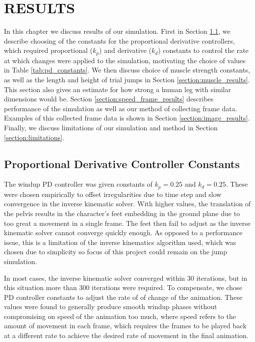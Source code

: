 
 
\chapter{RESULTS}
\label{chapter:results}
In this chapter we discuss results of our simulation.  First in Section \ref{section:pd_constants_results}, we describe choosing of the constants for the proportional derivative controllers, which required proportional ($k_p$) and derivative ($k_d$) constants to control the rate at which changes were applied to the simulation, motivating the choice of values in Table \ref{tab:pd_constants}.  We then discuss choice of muscle strength constants, as well as the length and height of trial jumps in Section \ref{section:muscle_results}.  This section also gives an estimate for how strong a human leg with similar dimensions would be.  Section \ref{section:speed_frame_results} describes performance of the simulation as well as our method of collecting frame data.  Examples of this collected frame data is shown in Section \ref{section:image_results}.  Finally, we discuss limitations of our simulation and method in Section \ref{section:limitations}.

\section{Proportional Derivative Controller Constants}
\label{section:pd_constants_results}
The windup PD controller was given constants of $k_p = 0.25$ and $k_d = 0.25$.  These were chosen empirically to offset irregularities due to time step and slow convergence in the inverse kinematic solver.  With higher values, the translation of the pelvis results in the character's feet embedding in the ground plane due to too great a movement in a single frame.  The feet then fail to adjust as the inverse kinematic solver cannot converge quickly enough.  As opposed to a performance issue, this is a limitation of the inverse kinematics algorithm used, which was chosen due to simplicity so focus of this project could remain on the jump simulation.  

In most cases, the inverse kinematic solver converged within 30 iterations, but in this situation more than 300 iterations were required.  To compensate, we chose PD controller constants to adjust the rate of of change of the animation.  These values were found to generally produce smooth windup phases without compromising on speed of the animation too much, where speed refers to the amount of movement in each frame, which requires the frames to be played back at a different rate to achieve the desired rate of movement in the final animation.

